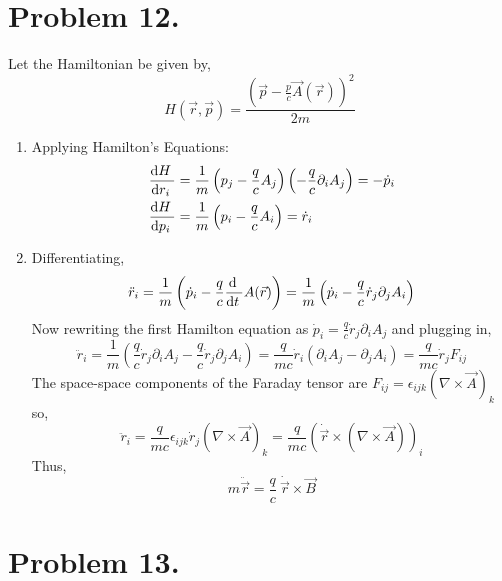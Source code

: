 \documentclass[12pt]{extarticle}
\begin{document}

\section*{Problem 12.}

Let the Hamiltonian be given by, 
\[H(\vec{r}, \vec{p}) = \frac{\left(\vec{p} - \frac{p}{c} \vec{A}(\vec{r}) \right)^2}{2 m}\]
\begin{enumerate}
\item Applying Hamilton's Equations:
\begin{align*}
\frac{\mathrm{d}H \:}{\mathrm{d}r_i \:} &= \frac{1}{m} \left(p_j - \frac{q}{c} A_j \right) \left(-\frac{q}{c}  \partial_i A_j \right) = -\dot{p}_i \\ \frac{\mathrm{d}H \:}{\mathrm{d}p_i \:} &= \frac{1}{m} \left(p_i - \frac{q}{c} A_i \right) = \dot{r}_i
\end{align*}
\item Differentiating,
\[ \ddot{r}_i = \frac{1}{m} \left(\dot{p}_i - \frac{q}{c} \frac{\mathrm{d} \:}{\mathrm{d}t \:}A(\vec{r}) \right) = \frac{1}{m} \left(\dot{p}_i - \frac{q}{c} \dot{r}_j \partial_j A_i \right)\]
Now rewriting the first Hamilton equation as $\dot{p}_i = \frac{q}{c} \dot{r}_j \partial_i A_j$ and plugging in,
\[\ddot{r}_i = \frac{1}{m} \left(\frac{q}{c} \dot{r}_j \partial_i A_j - \frac{q}{c} \dot{r}_j \partial_j A_i \right) =  \frac{q}{mc} \dot{r}_i \left( \partial_i A_j - \partial_j A_i\right) = \frac{q}{mc} \dot{r}_j F_{ij}\]
The space-space components of the Faraday tensor are $F_{ij} = \epsilon_{ijk} \left(\nabla \times \vec{A} \right)_k$ so,
\[\ddot{r}_i = \frac{q}{mc} \epsilon_{ijk} \dot{r}_j \left(\nabla \times \vec{A} \right)_k = \frac{q}{mc} \left(\dot{\vec{r}} \times \left(\nabla \times \vec{A} \right) \right)_i \]
Thus, \[m \ddot{\vec{r}} = \frac{q}{c} \: \dot{\vec{r}} \times \vec{B}\]
\end{enumerate}

\section*{Problem 13.}
\end{document}
